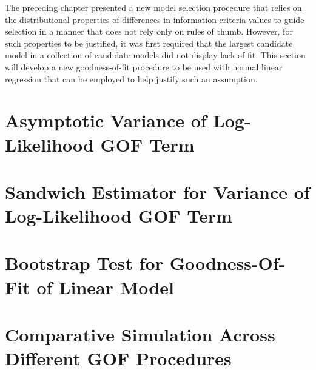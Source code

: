 \doublespace
{}

	The preceding chapter presented a new model selection procedure that relies on the distributional properties of differences in information criteria values to guide
	selection in a manner that does not rely only on rules of thumb. However, for such properties to be justified, it was first required that the largest candidate model
	in a collection of candidate models did not display lack of fit. This section will develop a new goodness-of-fit procedure to be used with normal linear regression
	that can be employed to help justify such an assumption.
		
		\section{Asymptotic Variance of Log-Likelihood GOF Term} \label{sec:asymp_var}
		
		\section{Sandwich Estimator for Variance of Log-Likelihood GOF Term} \label{sec:sand_var}
		
		\section{Bootstrap Test for Goodness-Of-Fit of Linear Model} \label{sec:boot_test}

		\section{Comparative Simulation Across Different GOF Procedures} \label{sec:gof_sim}